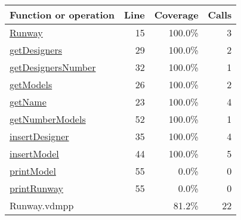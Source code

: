 \begin{longtable}{|l|r|r|r|}
\hline
Function or operation & Line & Coverage & Calls \\
\hline
\hline
\hyperref[Runway:15]{Runway} & 15&100.0\% & 3 \\
\hline
\hyperref[getDesigners:29]{getDesigners} & 29&100.0\% & 2 \\
\hline
\hyperref[getDesignersNumber:32]{getDesignersNumber} & 32&100.0\% & 1 \\
\hline
\hyperref[getModels:26]{getModels} & 26&100.0\% & 2 \\
\hline
\hyperref[getName:23]{getName} & 23&100.0\% & 4 \\
\hline
\hyperref[getNumberModels:52]{getNumberModels} & 52&100.0\% & 1 \\
\hline
\hyperref[insertDesigner:35]{insertDesigner} & 35&100.0\% & 4 \\
\hline
\hyperref[insertModel:44]{insertModel} & 44&100.0\% & 5 \\
\hline
\hyperref[printModel:55]{printModel} & 55&0.0\% & 0 \\
\hline
\hyperref[printRunway:55]{printRunway} & 55&0.0\% & 0 \\
\hline
\hline
Runway.vdmpp & & 81.2\% & 22 \\
\hline
\end{longtable}

